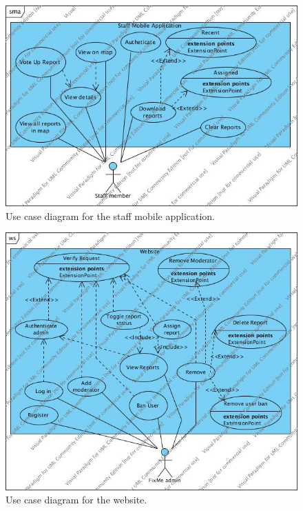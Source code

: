 \documentclass[12pt]{ecsproject}     %
\begin{document}
\begin{figure}[h]
\includegraphics[scale=0.7]{uml/sma.jpg}
\caption{Use case diagram for the staff mobile application.}
\end{figure}

\begin{figure}[h]
\includegraphics[scale=0.7]{uml/ws.jpg}
\caption{Use case diagram for the website.}
\end{figure}
\end{document}
